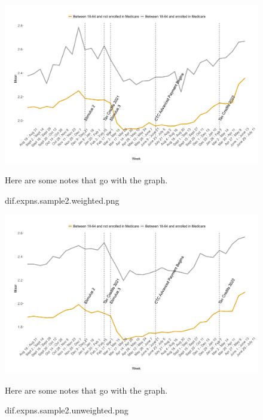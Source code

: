 \documentclass[12pt]{article}
\begin{document}
\begin{figure}[!ht]\label{dif.expns.sample2.weighted.png}
\caption{dif.expns.sample2.weighted.png}
\centering
\includegraphics[scale=0.3]{dif.expns.sample2.weighted.png}
\medskip 
\begin{minipage}{0.65\textwidth} 
{\footnotesize Here are some notes that go with the graph.  \par}
\end{minipage}
\end{figure}

\begin{figure}[!ht]\label{dif.expns.sample2.unweighted.png}
\caption{dif.expns.sample2.unweighted.png}
\centering
\includegraphics[scale=0.3]{dif.expns.sample2.unweighted.png}
\medskip 
\begin{minipage}{0.65\textwidth} 
{\footnotesize Here are some notes that go with the graph.  \par}
\end{minipage}
\end{figure}
\end{document}
